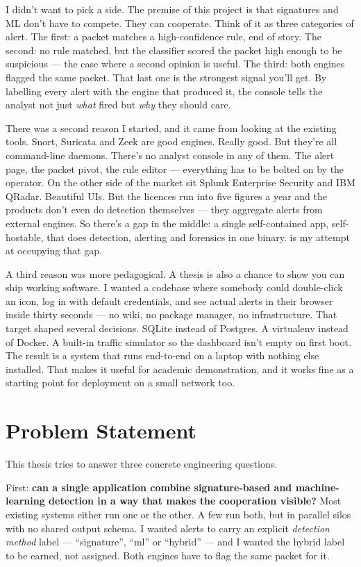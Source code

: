 I didn't want to pick a side. The premise of this project is
that signatures and ML don't have to compete. They can
cooperate. Think of it as three categories of alert. The first:
a packet matches a high-confidence rule, end of story. The
second: no rule matched, but the classifier scored the packet
high enough to be suspicious --- the case where a second
opinion is useful. The third: both engines flagged the same
packet. That last one is the strongest signal you'll get. By
labelling every alert with the engine that produced it, the
console tells the analyst not just \emph{what} fired but
\emph{why} they should care.

There was a second reason I started, and it came from looking
at the existing tools. Snort, Suricata and Zeek are good
engines. Really good. But they're all command-line daemons.
There's no analyst console in any of them. The alert page, the
packet pivot, the rule editor --- everything has to be bolted
on by the operator. On the other side of the market sit Splunk
Enterprise Security and IBM QRadar. Beautiful UIs. But the
licences run into five figures a year and the products don't
even do detection themselves --- they aggregate alerts from
external engines. So there's a gap in the middle: a single
self-contained app, self-hostable, that does detection,
alerting and forensics in one binary. \nidsname{} is my attempt
at occupying that gap.

A third reason was more pedagogical. A thesis is also a chance
to show you can ship working software. I wanted a codebase
where somebody could double-click an icon, log in with default
credentials, and see actual alerts in their browser inside
thirty seconds --- no wiki, no package manager, no
infrastructure. That target shaped several decisions. SQLite
instead of Postgres. A virtualenv instead of Docker. A built-in
traffic simulator so the dashboard isn't empty on first boot.
The result is a system that runs end-to-end on a laptop with
nothing else installed. That makes it useful for academic
demonstration, and it works fine as a starting point for
deployment on a small network too.

\section{Problem Statement}
\label{sec:problem-statement}

This thesis tries to answer three concrete engineering questions.

First: \textbf{can a single application combine signature-based and
machine-learning detection in a way that makes the cooperation
visible?} Most existing systems either run one or the other. A few
run both, but in parallel silos with no shared output schema. I
wanted alerts to carry an explicit \emph{detection method} label
--- ``signature'', ``ml'' or ``hybrid'' --- and I wanted the
hybrid label to be earned, not assigned. Both engines have to
flag the same packet for it.

